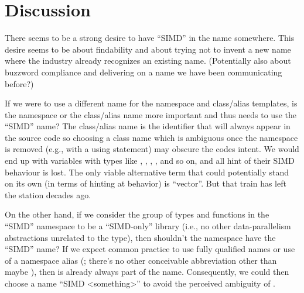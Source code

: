 \section{Discussion}

There seems to be a strong desire to have “SIMD” in the name somewhere.
This desire seems to be about findability and about trying not to invent a new name where the
industry already recognizes an existing name.
(Potentially also about buzzword compliance and delivering on a name we have been communicating
before?)

If we were to use a different name for the namespace and class/alias templates, is the namespace
or the class/alias name more important and thus needs to use the “SIMD” name?
The class/alias name is the identifier that will always appear in the source code so choosing a
class name which is ambiguous once the namespace is removed (e.g., with a using statement) may obscure
the codes intent.
We would end up with variables with types like , , ,
, and so on, and all hint of their SIMD behaviour is lost.
The only viable alternative term that could potentially stand on its own (in terms of hinting at
behavior) is “vector”.
But that train has left the station decades ago.

On the other hand, if we consider the group of types and functions in the “SIMD” namespace to be a
“SIMD-only” library (i.e., no other data-parallelism abstractions unrelated to the 
type), then shouldn't the namespace have the “SIMD” name?
If we expect common practice to use fully qualified names or use of a namespace alias
(; there's no other conceivable abbreviation other than maybe
), then  is already always part of the name.
Consequently, we could then choose a name “SIMD <something>” to avoid the perceived ambiguity of
.

